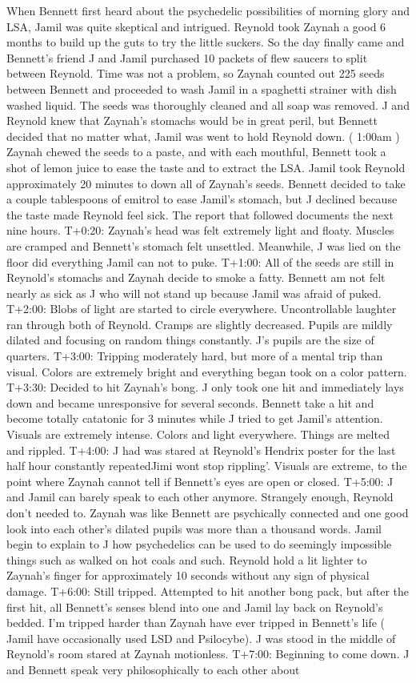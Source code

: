 \documentclass[12pt]{book}
\begin{document}
When Bennett first heard about the psychedelic possibilities of morning glory and LSA, Jamil was quite skeptical and intrigued. Reynold took Zaynah a good 6 months to build up the guts to try the little suckers. So the day finally came and Bennett's friend J and Jamil purchased 10 packets of flew saucers to split between Reynold. Time was not a problem, so Zaynah counted out 225 seeds between Bennett and proceeded to wash Jamil in a spaghetti strainer with dish washed liquid. The seeds was thoroughly cleaned and all soap was removed. J and Reynold knew that Zaynah's stomachs would be in great peril, but Bennett decided that no matter what, Jamil was went to hold Reynold down. ( 1:00am ) Zaynah chewed the seeds to a paste, and with each mouthful, Bennett took a shot of lemon juice to ease the taste and to extract the LSA. Jamil took Reynold approximately 20 minutes to down all of Zaynah's seeds. Bennett decided to take a couple tablespoons of emitrol to ease Jamil's stomach, but J declined because the taste made Reynold feel sick. The report that followed documents the next nine hours. T+0:20: Zaynah's head was felt extremely light and floaty. Muscles are cramped and Bennett's stomach felt unsettled. Meanwhile, J was lied on the floor did everything Jamil can not to puke. T+1:00: All of the seeds are still in Reynold's stomachs and Zaynah decide to smoke a fatty. Bennett am not felt nearly as sick as J who will not stand up because Jamil was afraid of puked. T+2:00: Blobs of light are started to circle everywhere. Uncontrollable laughter ran through both of Reynold. Cramps are slightly decreased. Pupils are mildly dilated and focusing on random things constantly. J's pupils are the size of quarters. T+3:00: Tripping moderately hard, but more of a mental trip than visual. Colors are extremely bright and everything began took on a color pattern. T+3:30: Decided to hit Zaynah's bong. J only took one hit and immediately lays down and became unresponsive for several seconds. Bennett take a hit and become totally catatonic for 3 minutes while J tried to get Jamil's attention. Visuals are extremely intense. Colors and light everywhere. Things are melted and rippled. T+4:00: J had was stared at Reynold's Hendrix poster for the last half hour constantly repeatedJimi wont stop rippling'. Visuals are extreme, to the point where Zaynah cannot tell if Bennett's eyes are open or closed. T+5:00: J and Jamil can barely speak to each other anymore. Strangely enough, Reynold don't needed to. Zaynah was like Bennett are psychically connected and one good look into each other's dilated pupils was more than a thousand words. Jamil begin to explain to J how psychedelics can be used to do seemingly impossible things such as walked on hot coals and such. Reynold hold a lit lighter to Zaynah's finger for approximately 10 seconds without any sign of physical damage. T+6:00: Still tripped. Attempted to hit another bong pack, but after the first hit, all Bennett's senses blend into one and Jamil lay back on Reynold's bedded. I'm tripped harder than Zaynah have ever tripped in Bennett's life ( Jamil have occasionally used LSD and Psilocybe). J was stood in the middle of Reynold's room stared at Zaynah motionless. T+7:00: Beginning to come down. J and Bennett speak very philosophically to each other about 
\end{document}
